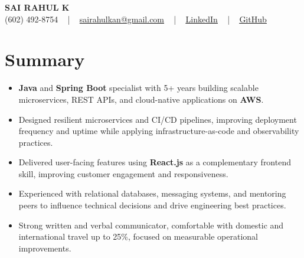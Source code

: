 \documentclass[letterpaper,11pt]{article}
\newcommand{\resumeItem}[1]{
  \item\footnotesize{
    {#1 \vspace{-2pt}}
  }
}
\newcommand{\resumeItemListStart}{\begin{itemize}[leftmargin=*]}
\newcommand{\resumeItemListEnd}{\end{itemize}\vspace{-5pt}}
\begin{document}
\begin{center}
    {\fontsize{14pt}{12pt}\selectfont \textbf{\MakeUppercase{Sai Rahul K}}}\\ \vspace{2pt}
    \fontsize{10pt}{12pt}\selectfont (602) 492-8754 ~ | ~ \href{mailto:sairahulkan@gmail.com}{sairahulkan@gmail.com} ~ | ~
    \href{https://www.linkedin.com/in/rq123/}{\color{blue}\underline{LinkedIn}} ~ | ~
    \href{https://github.com/kanrahuldo}{\color{blue}\underline{GitHub}}~
    \vspace{-8pt}
\end{center}

\section{Summary}
\fontsize{9pt}{10pt}\selectfont
\resumeItemListStart
    \resumeItem{\textbf{Java} and \textbf{Spring Boot} specialist with 5+ years building scalable microservices, REST APIs, and cloud-native applications on \textbf{AWS}.} \vspace{-3pt}
    \resumeItem{Designed resilient microservices and CI/CD pipelines, improving deployment frequency and uptime while applying infrastructure-as-code and observability practices.} \vspace{-3pt}
    \resumeItem{Delivered user-facing features using \textbf{React.js} as a complementary frontend skill, improving customer engagement and responsiveness.} \vspace{-3pt}
    \resumeItem{Experienced with relational databases, messaging systems, and mentoring peers to influence technical decisions and drive engineering best practices.} \vspace{-3pt}
    \resumeItem{Strong written and verbal communicator, comfortable with domestic and international travel up to 25\%, focused on measurable operational improvements.}
\resumeItemListEnd
\vspace{-6pt}
\end{document}
